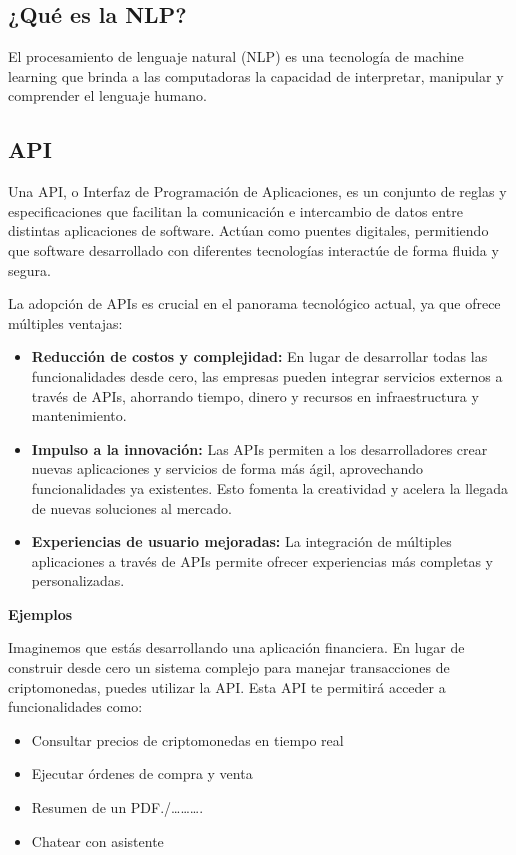 \documentclass[
  10pt,
  letterpaper,
]{book}
\providecommand{\tightlist}{%
  \setlength{\itemsep}{0pt}\setlength{\parskip}{0pt}}\usepackage{longtable,booktabs,array}
\begin{document}
\subsection{¿Qué es la NLP?}\label{quuxe9-es-la-nlp}

El procesamiento de lenguaje natural (NLP) es una tecnología de machine
learning que brinda a las computadoras la capacidad de interpretar,
manipular y comprender el lenguaje humano.

\subsection{API}\label{api}

Una API, o Interfaz de Programación de Aplicaciones, es un conjunto de
reglas y especificaciones que facilitan la comunicación e intercambio de
datos entre distintas aplicaciones de software. Actúan como puentes
digitales, permitiendo que software desarrollado con diferentes
tecnologías interactúe de forma fluida y segura.

La adopción de APIs es crucial en el panorama tecnológico actual, ya que
ofrece múltiples ventajas:

\begin{itemize}
\tightlist
\item
  \textbf{Reducción de costos y complejidad:} En lugar de desarrollar
  todas las funcionalidades desde cero, las empresas pueden integrar
  servicios externos a través de APIs, ahorrando tiempo, dinero y
  recursos en infraestructura y mantenimiento.
\item
  \textbf{Impulso a la innovación:} Las APIs permiten a los
  desarrolladores crear nuevas aplicaciones y servicios de forma más
  ágil, aprovechando funcionalidades ya existentes. Esto fomenta la
  creatividad y acelera la llegada de nuevas soluciones al mercado.
\item
  \textbf{Experiencias de usuario mejoradas:} La integración de
  múltiples aplicaciones a través de APIs permite ofrecer experiencias
  más completas y personalizadas.
\end{itemize}

\textbf{Ejemplos}

Imaginemos que estás desarrollando una aplicación financiera. En lugar
de construir desde cero un sistema complejo para manejar transacciones
de criptomonedas, puedes utilizar la API. Esta API te permitirá acceder
a funcionalidades como:

\begin{itemize}
\tightlist
\item
  Consultar precios de criptomonedas en tiempo real
\item
  Ejecutar órdenes de compra y venta
\item
  Resumen de un PDF./\ldots\ldots\ldots.
\item
  Chatear con asistente
\end{itemize}
\end{document}

